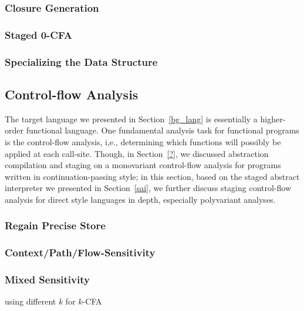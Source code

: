 \subsubsection{Closure Generation}

\subsubsection{Staged 0-CFA}

\subsubsection{Specializing the Data Structure}


\subsection{Control-flow Analysis} \label{cfa}

The target language we presented in Section~\ref{bg_lang} is essentially a higher-order functional language.
One fundamental analysis task for functional programs is the control-flow analysis, i,e., determining
which functions will possibly be applied at each call-site. 
Though, in Section~\ref{?}, we discussed abstraction compilation and staging on a monovariant 
control-flow analysis for programs written in continuation-passing style; 
in this section, based on the staged abstract interpreter we presented in Section~\ref{sai}, 
we further discuss staging control-flow analysis for direct style languages in depth, 
especially polyvariant analyses.

\subsubsection{Regain Precise Store}

\subsubsection{Context/Path/Flow-Sensitivity}

\subsubsection{Mixed Sensitivity}

using different $k$ for $k$-CFA

